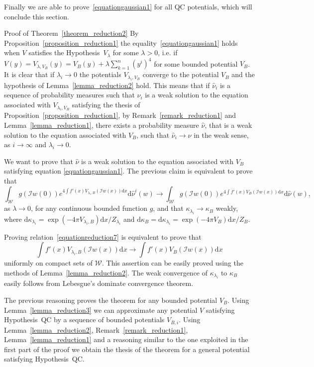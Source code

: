 \documentclass[a4paper,10pt]{article}
\newcommand{\mathd}{\mathrm{d}}
\newenvironment{proof*}[1]{\noindent\textbf{#1\ }}{\hspace*{\fill}$\Box$\medskip}
\begin{document}
Finally we are able to prove~{\eqref{equationgaussian1}} for all QC
potentials, which will conclude this section.

\begin{proof*}{Proof of Theorem~\ref{theorem_reduction2}}
  By Proposition~\ref{proposition_reduction1} the
  equality~{\eqref{equationgaussian1}} holds when $V$ satisfies the
  Hypothesis~$V_{\lambda}$ for some $\lambda > 0$, i.e. if $V (y) =
  V_{\lambda, V_B} (y) = V_B (y) + \lambda \sum_{k = 1}^n (y^i)^4$ for some
  bounded potential $V_B$. It is clear that if $\lambda_i \rightarrow 0$ the
  potentials $V_{\lambda_i, V_B}$ converge to the potential $V_B$ and the
  hypothesis of Lemma~\ref{lemma_reduction2} hold. This means that if
  $\hat{\nu}_i$ is a sequence of probability measures such that $\hat{\nu}_i$
  is a weak solution to the equation associated with $V_{\lambda_i, V_B}$
  satisfying the thesis of Proposition~\ref{proposition_reduction1}, by
  Remark~\ref{remark_reduction1} and Lemma~\ref{lemma_reduction1}, there
  exists a probability measure $\hat{\nu}$, that is a weak solution to the
  equation associated with $V_B$, such that $\hat{\nu}_i \rightarrow \nu$ in
  the weak sense, as $i \rightarrow \infty$ and $\lambda_i \rightarrow 0$.
  
  We want to prove that $\hat{\nu}$ is a weak solution to the equation
  associated with $V_B$ satisfying equation {\eqref{equationgaussian1}}. The
  previous claim is equivalent to prove that
  \begin{equation}
    \int_{\mathcal{W}} g (\mathcal{I}w (0)) e^{4 \int f' (x) V_{\lambda_i, B}
    (\mathcal{I}w (x)) \mathd x} \mathd \hat{\nu}^i (w) \rightarrow
    \int_{\mathcal{W}} g (\mathcal{I}w (0)) e^{4 \int f' (x) V_B (\mathcal{I}w
    (x)) \mathd x} \mathd \hat{\nu} (w), \label{equationreduction7}
  \end{equation}
  as $\lambda \rightarrow 0$, for any continuous bounded function $g$, and
  that $\kappa_{\lambda_i} \rightarrow \kappa_B$ weakly, where $\mathd
  \kappa_{\lambda_i} = \exp (- 4 \pi V_{\lambda_i, B}) \mathd x /
  Z_{\lambda_i}$ and $\mathd \kappa_B = \mathd \kappa_{\lambda_i} = \exp (- 4
  \pi V_B) \mathd x / Z_B$.
  
  Proving relation~{\eqref{equationreduction7}} is equivalent to prove that
  \[ \int f' (x) V_{\lambda_i, B} (\mathcal{I}w (x)) \mathd x \rightarrow \int
     f' (x) V_B (\mathcal{I}w (x)) \mathd x \]
  uniformly on compact sets of $\mathcal{W}$. This assertion can be easily
  proved using the methods of Lemma~\ref{lemma_reduction2}. The weak
  convergence of $\kappa_{\lambda_i}$ to $\kappa_B$ easily follows from
  Lebesgue's dominate convergence theorem.
  
  The previous reasoning proves the theorem for any bounded potential $V_B$.
  Using Lemma~\ref{lemma_reduction3} we can approximate any potential $V$
  satisfying Hypothesis~QC by a sequence of bounded potentials $V_{B, i}$.
  Using Lemma~\ref{lemma_reduction2}, Remark~\ref{remark_reduction1},
  Lemma~\ref{lemma_reduction1} and a reasoning similar to the one exploited in
  the first part of the proof we obtain the thesis of the theorem for a
  general potential satisfying Hypothesis~QC. 
\end{proof*}
\end{document}
